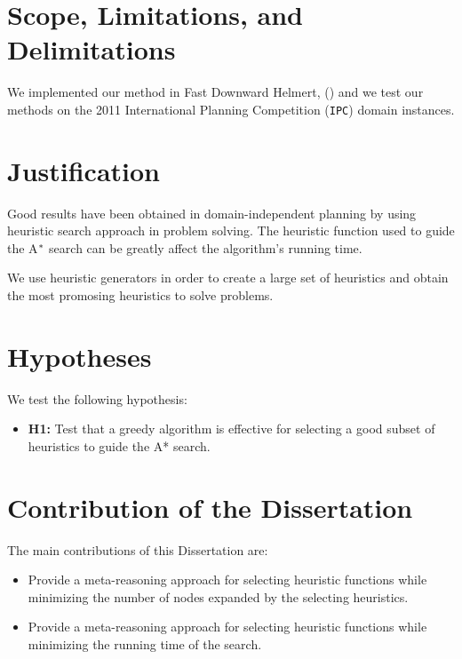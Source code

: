 \section{Scope, Limitations, and Delimitations}
\noindent
We implemented our method in Fast Downward Helmert,  (\citeyear{helmert2006fast}) and we test our methods on the 2011 International Planning Competition (\texttt{IPC}) domain instances.

\section{Justification}
\noindent
Good results have been obtained in domain-independent planning by using heuristic search approach in problem solving. The heuristic function used to guide the A$\sp{*}$ search can be greatly affect the algorithm's running time.

We use heuristic generators in order to create a large set of heuristics and obtain the most promosing heuristics to solve problems.

\section{Hypotheses}
\noindent
We test the following hypothesis:
\begin{itemize}
\item \textbf{H1:} Test that a greedy algorithm is effective for selecting a good subset of heuristics to guide the A* search.
\end{itemize}

\section{Contribution of the Dissertation}
\noindent
The main contributions of this Dissertation are:
\begin{itemize}
\item Provide a meta-reasoning approach for selecting heuristic functions while minimizing the number of nodes expanded by the selecting heuristics.

\item Provide a meta-reasoning approach for selecting heuristic functions while minimizing the running time of the search. 
\end{itemize}

